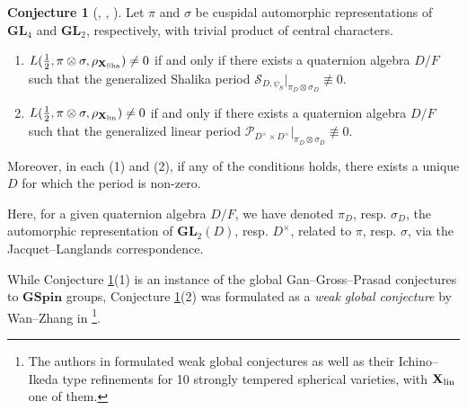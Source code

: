 \documentclass[11pt, reqno]{amsart}
\theoremstyle{plain}
\theoremstyle{definition}
\newtheorem{conjecture}[theorem]{Conjecture}
\theoremstyle{remark}
\theoremstyle{plain}
\def\GSpin{{\mathbf{GSpin}}}
\def\GL{\mathbf{GL}}
\begin{document}
\begin{conjecture}[{\cite{GGPOriginal}, \cite[\S 17]{SakellaridisVenkatesh}, \cite[Conjecture 1.9]{Wan:Zhang:Spherical:Periods}}]\label{conj:Wan:Zhang:+:Bessel:GGP}
Let $\pi$ and $\sigma$ be cuspidal automorphic representations of $\GL_4$ and $\GL_2$, respectively, with trivial product of central characters.
\begin{enumerate}
\item $L(\frac{1}{2},\pi \otimes \sigma,\rho_{\mathbf{X}_{\rm Sha}})\neq 0$ if and only if there exists a quaternion algebra $D/F$ such that the generalized Shalika period $\mathcal{S}_{D,\psi_S}|_{\pi_D \otimes \sigma_D} \not \equiv 0$. 
\item $L(\frac{1}{2},\pi \otimes \sigma,\rho_{\mathbf{X}_{\rm lin}})\neq 0$ if and only if there exists a quaternion algebra $D/F$ such that the generalized linear period $\mathcal{P}_{D^\times \times D^\times}|_{\pi_D \otimes \sigma_D} \not \equiv 0$.
\end{enumerate}
Moreover, in each (1) and (2), if any of the conditions holds, there exists a unique $D$ for which the period is non-zero.
\end{conjecture}
\noindent Here, for a given quaternion algebra $D/F$, we have denoted $\pi_D$, resp. $\sigma_D$, the automorphic representation of $\GL_2(D)$, resp. $D^\times$, related to $\pi$, resp. $\sigma$, via the Jacquet--Langlands correspondence. 

\noindent While Conjecture \ref{conj:Wan:Zhang:+:Bessel:GGP}(1) is an instance of the global Gan--Gross--Prasad conjectures to $\GSpin$ groups, Conjecture \ref{conj:Wan:Zhang:+:Bessel:GGP}(2) was formulated as a \emph{weak global conjecture} by Wan--Zhang in \cite{Wan:Zhang:Spherical:Periods}\footnote{The authors in \cite{Wan:Zhang:Spherical:Periods} formulated weak global conjectures as well as their Ichino--Ikeda type refinements for 10 strongly tempered spherical varieties, with $\mathbf{X}_{\rm lin}$ one of them.}. 
\end{document}

